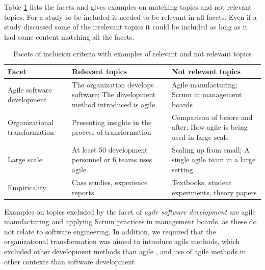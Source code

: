 \documentclass[preprint,authoryear,12pt]{elsarticle}
\begin{document}
Table \ref{table:facets} lists the facets and gives examples on matching topics
and not relevant topics. For a study to be included it needed to be relevant
in all facets. Even if a study discussed some of the irrelevant topics it could
be included as long as it had some content matching all the facets.

\begin{table}
    \centering
    \begin{tabular}{ >{\raggedright\arraybackslash}p{}
                     >{\raggedright\arraybackslash}p{}
                     >{\raggedright\arraybackslash}p{} }
        \toprule
        Facet  &  Relevant topics  &  Not relevant topics  \\
        \midrule
        Agile software development  & 
                The organization develops software;
                The development method introduced is agile  & 
                
                Agile manufacturing;
                Scrum in management boards  \\
                
        Organizational transformation  &
                Presenting insights in the process of transformation  &
                
                Comparison of before and after;
                How agile is being used in large scale   \\
                
        Large scale    &
                At least 50 development personnel or 6 teams uses agile &
                
                Scaling up from small;
                A single agile team in a large setting \\
                
        Empiricality   &
                Case studies, experience reports  &
                
                Textbooks, student experiments, theory papers  \\
        \bottomrule
    \end{tabular}
    \caption{Facets of inclusion criteria with examples of relevant and
             not relevant topics}
    \label{table:facets}
\end{table}

Examples on topics excluded by the facet of \emph{agile software development}
are agile manufacturing and applying Scrum practices in management boards, as
these do not relate to software engineering. In addition, we required that the
organizational transformation was aimed to introduce agile methods, which
excluded other development methods than agile \cite{Sagesser2013}, and use of
agile methods in other contexts than software development \cite{Hodgkins2007}.
\end{document}
